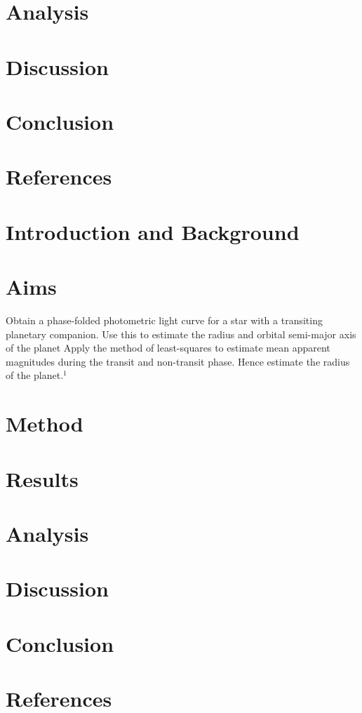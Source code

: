\documentclass[]{article}
\begin{document}
\section*{Analysis}
\section*{Discussion}

\section*{Conclusion}

\section*{References}

\newpage
\section*{Introduction and Background}

\section*{Aims}

Obtain a phase-folded photometric light curve for a star with a transiting planetary companion. Use this to estimate the radius and orbital semi-major axis of the planet
Apply the method of least-squares to estimate mean apparent magnitudes during the transit and non-transit phase. Hence estimate the radius of the planet.$^1$


\section*{Method}

\section*{Results}

\section*{Analysis}
\section*{Discussion}

\section*{Conclusion}

\section*{References}
\end{document}
